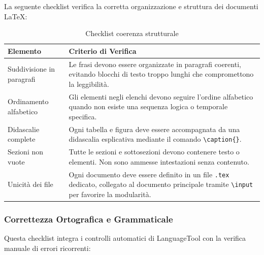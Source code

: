 \documentclass[a4paper,11pt,oneside]{scrartcl}
\begin{document}
La seguente checklist verifica la corretta organizzazione e struttura dei documenti \LaTeX:

\begin{table}[H]
    \centering
    \renewcommand{\arraystretch}{1.4}
    \begin{tabularx}{\textwidth}{@{}p{}X@{}}
        \toprule
        \textbf{Elemento}         & \textbf{Criterio di Verifica}                                                                                                                                              \\
        \midrule
        Suddivisione in paragrafi & Le frasi devono essere organizzate in paragrafi coerenti, evitando blocchi di testo troppo lunghi che compromettono la leggibilità.                                        \\
        \midrule
        Ordinamento alfabetico    & Gli elementi negli elenchi devono seguire l'ordine alfabetico quando non esiste una sequenza logica o temporale specifica.                                                 \\
        \midrule
        Didascalie complete       & Ogni tabella e figura deve essere accompagnata da una didascalia esplicativa mediante il comando \texttt{\textbackslash caption\{\}}.                                      \\
        \midrule
        Sezioni non vuote         & Tutte le sezioni e sottosezioni devono contenere testo o elementi. Non sono ammesse intestazioni senza contenuto.                                                          \\
        \midrule
        Unicità dei file          & Ogni documento deve essere definito in un file \texttt{.tex} dedicato, collegato al documento principale tramite \texttt{\textbackslash input} per favorire la modularità. \\
        \bottomrule
    \end{tabularx}
    \caption{Checklist coerenza strutturale}
\end{table}

\subsubsection{Correttezza Ortografica e Grammaticale}

Questa checklist integra i controlli automatici di LanguageTool con la verifica manuale di errori ricorrenti:
\end{document}
